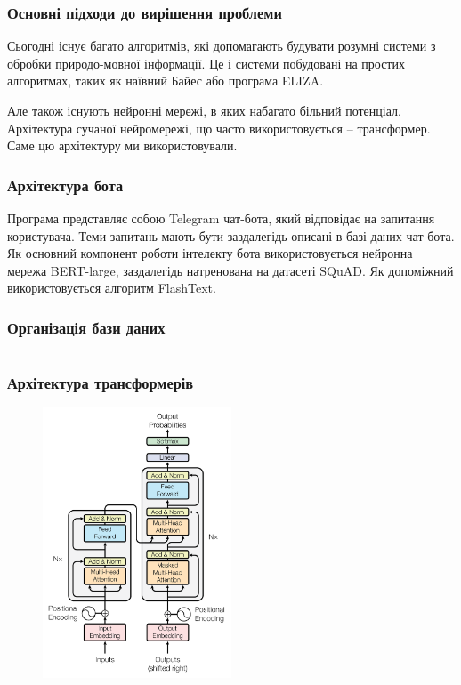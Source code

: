 \documentclass{beamer}
\begin{document}
\begin{frame}
    \frametitle{Основні підходи до вирішення проблеми}
    Сьогодні існує багато алгоритмів, які допомагають будувати розумні системи з обробки природо-мовної інформації. Це і системи побудовані на простих алгоритмах, таких як наївний Байес або програма ELIZA.

    Але також існують нейронні мережі, в яких набагато більний потенціал. Архітектура сучаної нейромережі, що часто використовується -- трансформер. Саме цю архітектуру ми використовували.
\end{frame}

\begin{frame}
    \frametitle{Архітектура бота}
    Програма представляє собою Telegram чат-бота, який відповідає на запитання користувача. Теми запитань мають бути заздалегідь описані в базі даних чат-бота. Як основний компонент роботи інтелекту бота використовується нейронна мережа BERT-large, заздалегідь натренована на датасеті SQuAD. Як допоміжний використовується алгоритм FlashText.
\end{frame}

\begin{frame}
    \frametitle{Організація бази даних}
    \inputminted[breaklines,linenos=true]{yaml}{sample.yaml}
\end{frame}

\begin{frame}
    \frametitle{Архітектура трансформерів}
    \begin{figure}[H]
        \centering
        \includegraphics[width=0.5\textwidth]{transformer.png}
    \end{figure}
\end{frame}
\end{document}
